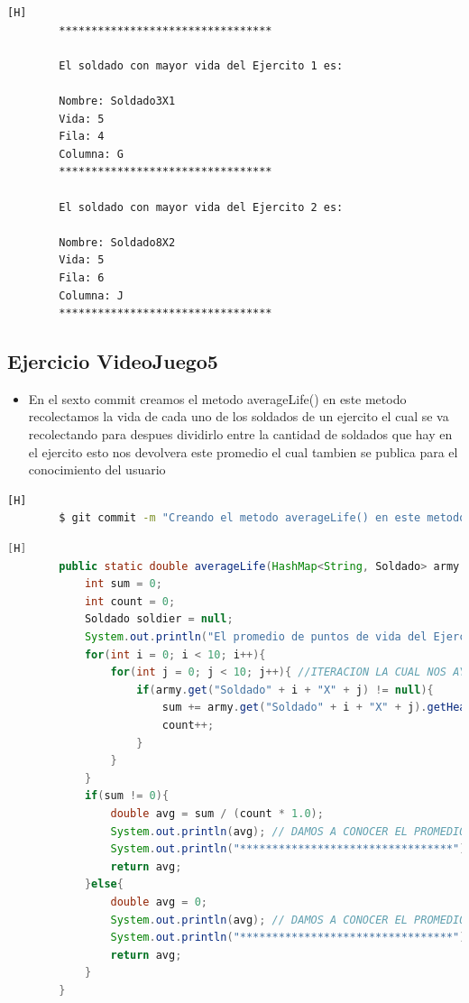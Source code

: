 \documentclass{article}
\begin{document}
	\begin{lstlisting}[language=bash,caption={Ejecucion:}][H]
		*********************************

		El soldado con mayor vida del Ejercito 1 es: 

		Nombre: Soldado3X1
		Vida: 5
		Fila: 4
		Columna: G
		*********************************

		El soldado con mayor vida del Ejercito 2 es: 

		Nombre: Soldado8X2
		Vida: 5
		Fila: 6
		Columna: J
		*********************************

	\end{lstlisting}
	\subsection{Ejercicio VideoJuego5}
	\begin{itemize}	
		\item En el sexto commit creamos el metodo averageLife() en este metodo recolectamos la vida de cada uno de los soldados de un ejercito el cual se va recolectando para despues dividirlo entre la cantidad de soldados que hay en el ejercito esto nos devolvera este promedio el cual tambien se publica para el conocimiento del usuario
	\end{itemize}	
	\begin{lstlisting}[language=bash,caption={Commit}][H]
		$ git commit -m "Creando el metodo averageLife() en este metodo recolectamos la vida de cada uno de los soldados de un ejercito el cual se va recolectando para despues dividirlo entre la cantidad de soldados que hay en el ejercito esto nos devolvera este promedio el cual tambien se publica para el conocimiento del usuario"
	\end{lstlisting}	
	\begin{lstlisting}[language=java,caption={Las lineas de codigos del metodo creado:}][H]
		public static double averageLife(HashMap<String, Soldado> army , int num){
			int sum = 0;
			int count = 0;
			Soldado soldier = null;
			System.out.println("El promedio de puntos de vida del Ejercito " + num + " es: ");
			for(int i = 0; i < 10; i++){
				for(int j = 0; j < 10; j++){ //ITERACION LA CUAL NOS AYUDA A PASAR POR TODOS LOS SOLDADOS DE CADA EJERCITO
					if(army.get("Soldado" + i + "X" + j) != null){ 
						sum += army.get("Soldado" + i + "X" + j).getHealth();
						count++;
					}
				}
			}
			if(sum != 0){
				double avg = sum / (count * 1.0);
				System.out.println(avg); // DAMOS A CONOCER EL PROMEDIO DE VIDA DE CADA EJERCITO 
				System.out.println("*********************************");
				return avg;
			}else{
				double avg = 0;
				System.out.println(avg); // DAMOS A CONOCER EL PROMEDIO DE VIDA DE CADA EJERCITO 
				System.out.println("*********************************");
				return avg;
			}
		}
	\end{lstlisting}
\end{document}
